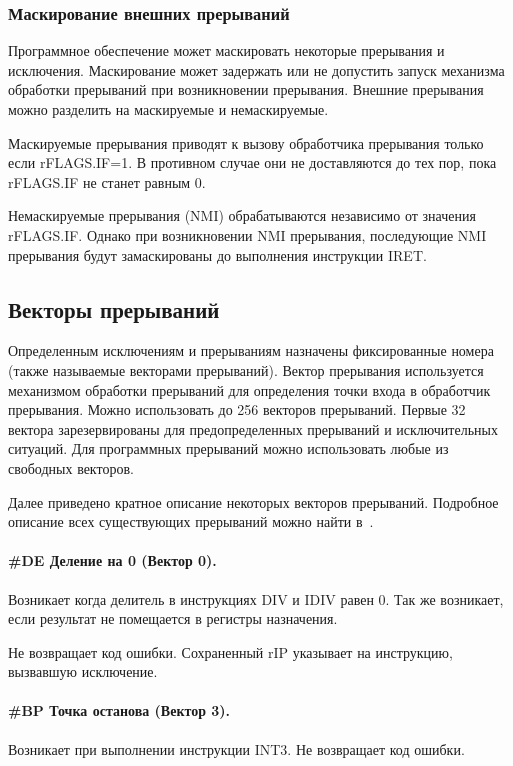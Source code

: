 \subsubsection*{Маскирование внешних прерываний}
Программное обеспечение может маскировать некоторые прерывания и исключения.
Маскирование может задержать или не допустить запуск механизма обработки
прерываний при возникновении прерывания. Внешние прерывания можно разделить на
маскируемые и немаскируемые.

Маскируемые прерывания приводят к вызову обработчика прерывания только если
rFLAGS.IF=1. В противном случае они не доставляются до тех пор, пока rFLAGS.IF
не станет равным 0.

Немаскируемые прерывания (NMI) обрабатываются независимо от значения rFLAGS.IF.
Однако при возникновении NMI прерывания, последующие NMI прерывания будут
замаскированы до выполнения инструкции IRET.

\subsection{Векторы прерываний}
Определенным исключениям и прерываниям назначены фиксированные номера (также
называемые векторами прерываний). Вектор прерывания используется механизмом обработки
прерываний для определения точки входа в обработчик прерывания. Можно использовать до
256 векторов прерываний. Первые 32 вектора зарезервированы для предопределенных прерываний
и исключительных ситуаций. Для программных прерываний можно использовать любые из
свободных векторов.

Далее приведено кратное описание некоторых векторов прерываний.
Подробное описание всех существующих прерываний можно найти в~\cite{amd_pm_v2}.

\paragraph{\#DE Деление на 0 (Вектор 0).}
Возникает когда делитель в инструкциях DIV и IDIV равен 0. Так же возникает,
если результат не помещается в регистры назначения.

Не возвращает код ошибки. Сохраненный rIP указывает на инструкцию, вызвавшую
исключение.

\paragraph{\#BP Точка останова (Вектор 3).}
Возникает при выполнении инструкции INT3. Не возвращает код ошибки.

